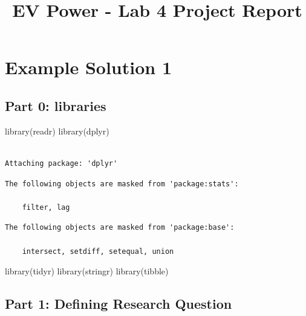 \documentclass[
  letterpaper,
  DIV=11,
  numbers=noendperiod]{scrartcl}
\title{EV Power - Lab 4 Project Report}
\author{}
\date{}
\newenvironment{Shaded}{\begin{snugshade}}{\end{snugshade}}
\newcommand{\FunctionTok}[1]{\textcolor[rgb]{0.28,0.35,0.67}{#1}}
\newcommand{\NormalTok}[1]{\textcolor[rgb]{0.00,0.23,0.31}{#1}}
\begin{document}
\maketitle


\section{Example Solution 1}\label{example-solution-1}

\subsection{\texorpdfstring{\textbf{Part 0:
libraries}}{Part 0: libraries}}\label{part-0-libraries}

\begin{Shaded}
\begin{Highlighting}[]
\FunctionTok{library}\NormalTok{(readr)}
\FunctionTok{library}\NormalTok{(dplyr)}
\end{Highlighting}
\end{Shaded}

\begin{verbatim}

Attaching package: 'dplyr'
\end{verbatim}

\begin{verbatim}
The following objects are masked from 'package:stats':

    filter, lag
\end{verbatim}

\begin{verbatim}
The following objects are masked from 'package:base':

    intersect, setdiff, setequal, union
\end{verbatim}

\begin{Shaded}
\begin{Highlighting}[]
\FunctionTok{library}\NormalTok{(tidyr)}
\FunctionTok{library}\NormalTok{(stringr)}
\FunctionTok{library}\NormalTok{(tibble)}
\end{Highlighting}
\end{Shaded}

\subsection{\texorpdfstring{\textbf{Part 1:} \textbf{Defining Research
Question}}{Part 1: Defining Research Question}}\label{part-1-defining-research-question}
\end{document}
